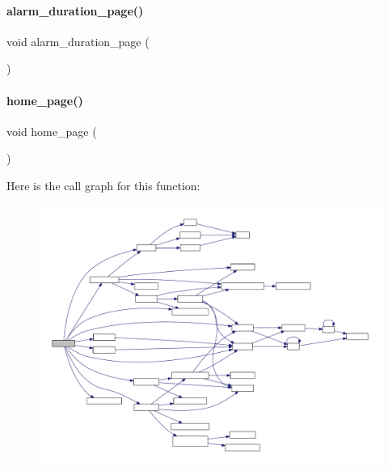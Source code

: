 \mbox{\label{a00038_af02de1a4f3739f457ed4aa92ccf71387}} 
\paragraph{alarm\+\_\+duration\+\_\+page()}
{\footnotesize\ttfamily void alarm\+\_\+duration\+\_\+page (\begin{DoxyParamCaption}{ }\end{DoxyParamCaption})}

\mbox{\label{a00038_a8d5652ab83eb295668bc20a3ad293236}} 
\paragraph{home\+\_\+page()}
{\footnotesize\ttfamily void home\+\_\+page (\begin{DoxyParamCaption}{ }\end{DoxyParamCaption})}

Here is the call graph for this function\+:
\nopagebreak
\begin{figure}[H]
\begin{center}
\leavevmode
\includegraphics[width=350pt]{a00038_a8d5652ab83eb295668bc20a3ad293236_cgraph}
\end{center}
\end{figure}
\mbox{\label{a00038_a457486e8b8211e75970f756106ebff2c}} 
